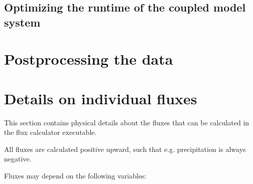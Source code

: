 \documentclass[a4paper,titlepage]{scrartcl}
\begin{document}
\subsection{Optimizing the runtime of the coupled model system}
\label{sec:optimizing}

\newpage
\section{Postprocessing the data}

\appendix
\newpage
\section{Details on individual fluxes}
This section contains physical details about the fluxes that can be calculated in the flux calculator executable.

All fluxes are calculated positive upward, such that e.g. precipitation is always negative.

Fluxes may depend on the following variables:
\end{document}
